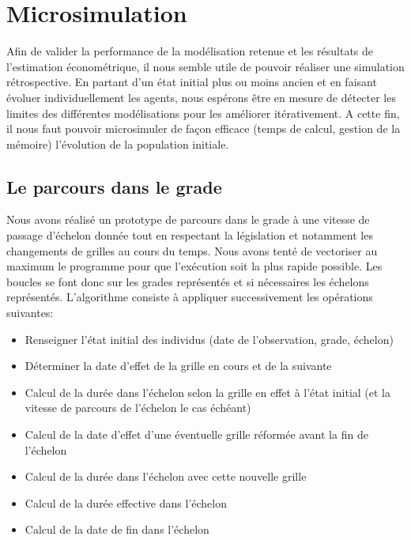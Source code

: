 \documentclass[11pt,a4paper]{article}
\begin{document}
\else \fi



\section{Microsimulation}


Afin de valider la performance de la modélisation retenue et les résultats de l'estimation économétrique, il nous semble utile de pouvoir réaliser une simulation rétrospective. En partant d'un état initial plus ou moins ancien et en faisant évoluer individuellement les agents, nous espérons être en mesure de détecter les limites des différentes modélisations pour les améliorer itérativement. A cette fin, il nous faut pouvoir microsimuler de façon efficace (temps de calcul, gestion de la mémoire) l'évolution de la population initiale.  


\subsection{Le parcours dans le grade}

Nous avons réalisé un prototype de parcours dans le grade à une vitesse de passage d'échelon donnée tout en respectant la législation et notamment les changements de grilles au cours du temps. Nous avons tenté de vectoriser au maximum le programme pour que l'exécution soit la plus rapide possible.
Les boucles se font donc sur les grades représentés et si nécessaires les échelons représentés. L'algorithme consiste à appliquer successivement les opérations suivantes:
\begin{itemize}
	\item Renseigner l'état initial des individus (date de l'observation, grade, échelon)
	\item Déterminer la date d'effet de la grille en cours et de la suivante
	\item Calcul de la durée dans l'échelon selon la grille en effet à l'état initial (et la vitesse de parcours de l'échelon le cas échéant)
	\item Calcul de la date d'effet d'une éventuelle grille réformée avant la fin de l'échelon
	\item Calcul de la durée dans l'échelon avec cette nouvelle grille
	\item Calcul de la durée effective dans l'échelon
	\item Calcul de la date de fin dans l'échelon
\end{itemize}
 
\end{document}
